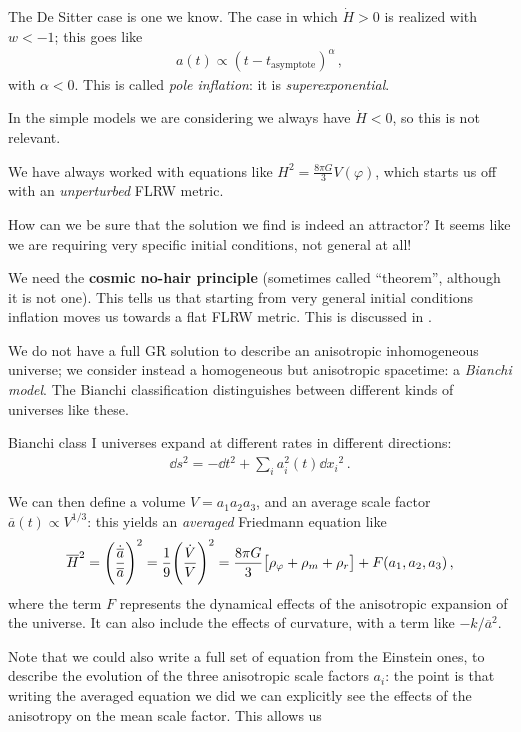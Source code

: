 \documentclass[main.tex]{subfiles}
\begin{document}
The De Sitter case is one we know. 
The case in which \(\dot{H} >0\) is realized with \(w < -1\); this goes like 
%
\begin{align}
a(t ) \propto (t-t _{\text{asymptote}})^{\alpha } 
\,,
\end{align}
%
with \(\alpha < 0\). This is called \emph{pole inflation}: it is \emph{superexponential}. 

In the simple models we are considering we always have \(\dot{H} < 0 \), so this is not relevant. 

We have always worked with equations like \(H^2 = \frac{8 \pi G}{3} V(\varphi )\), which starts us off with an \emph{unperturbed} FLRW metric.

How can we be sure that the solution we find is indeed an attractor? It seems like we are requiring very specific initial conditions, not general at all! 

We need the \textbf{cosmic no-hair principle} (sometimes called ``theorem'', although it is not one).
This tells us that starting from very general initial conditions inflation moves us towards a flat FLRW metric. 
This is discussed in \textcite[]{kolbEarlyUniverse1994}. 

We do not have a full GR solution to describe an anisotropic inhomogeneous universe; we consider instead a homogeneous but anisotropic spacetime: a \emph{Bianchi model}. 
The Bianchi classification distinguishes between different kinds of universes like these. 

Bianchi class I universes expand at different rates in different directions: 
%
\begin{align}
\dd{s^2} = - \dd{t}^2 + \sum _{i} a_i^2 (t) \dd{x_i}^2
\,.
\end{align}

We can then define a volume \(V = a_1 a_2 a_3 \), and an average scale factor \(\overline{a} (t) \propto V^{1/3}\): this yields an \emph{averaged} Friedmann equation like 
%
\begin{align}
\overline{H}^2 = \qty(\frac{\dot{\overline{a}}}{\overline{a}})^2 = \frac{1}{9} \qty(\frac{\dot{V}}{V})^2
 = \frac{8 \pi G}{3} \qty[\rho _\varphi + \rho _m + \rho _r]
 + F(a_1, a_2, a_3 )
\,,
\end{align}
%
where the term \(F\) represents the dynamical effects of the anisotropic expansion of the universe. 
It can also include the effects of curvature, with a term like \(- k / \overline{a}^2\).

Note that we could also write a full set of equation from the Einstein ones, to describe the evolution of the three anisotropic scale factors \(a_i\): the point is that writing the averaged equation we did we can explicitly see the effects of the anisotropy on the mean scale factor. This allows us 
\end{document}

